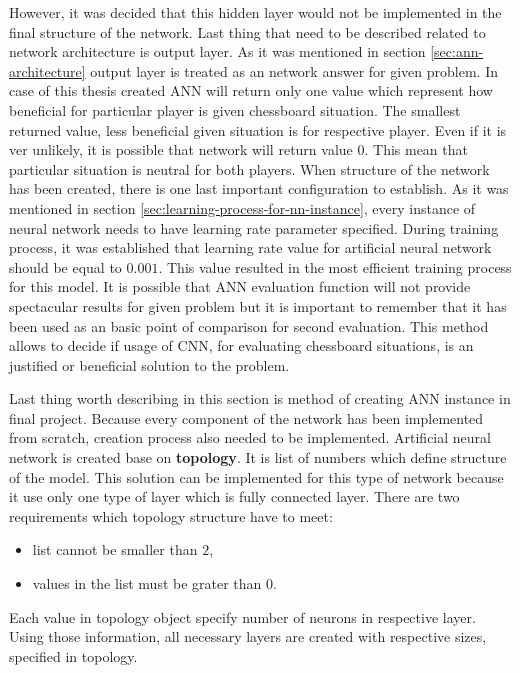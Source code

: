 However, it was decided that this hidden layer would not be implemented in the final structure of the network. Last thing that need to be described related to network architecture is output layer. As it was mentioned in section \ref{sec:ann-architecture} output layer is treated as an network answer for given problem. In case of this thesis created ANN will return only one value which represent how beneficial for particular player is given chessboard situation. The smallest returned value, less beneficial given situation is for respective player. Even if it is ver unlikely, it is possible that network will return value $0$. This mean that particular situation is neutral for both players. When structure of the network has been created, there is one last important configuration to establish. As it was mentioned in section \ref{sec:learning-process-for-nn-instance}, every instance of neural network needs to have learning rate parameter specified. During training process, it was established that learning rate value for artificial neural network should be equal to $0.001$. This value resulted in the most efficient training process for this model. It is possible that ANN evaluation function will not provide spectacular results for given problem but it is important to remember that it has been used as an basic point of comparison for second evaluation. This method allows to decide if usage of CNN, for evaluating chessboard situations, is an justified or beneficial solution to the problem.

Last thing worth describing in this section is method of creating ANN instance in final project. Because every component of the network has been implemented from scratch, creation process also needed to be implemented. Artificial neural network is created base on \textbf{topology}. It is list of numbers which define structure of the model. This solution can be implemented for this type of network because it use only one type of layer which is fully connected layer. There are two requirements which topology structure have to meet:
\begin{itemize}
	\item list cannot be smaller than $2$,
	\item values in the list must be grater than $0$.
\end{itemize}
Each value in topology object specify number of neurons in respective layer. Using those information, all necessary layers are created with respective sizes, specified in topology.


